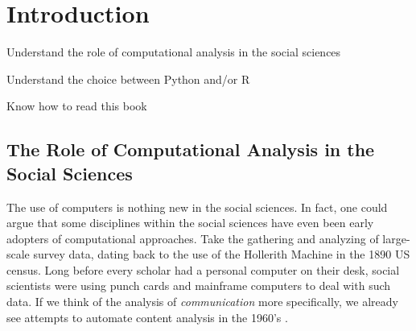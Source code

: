 \chapter{Introduction}
\label{chap:introduction}

\begin{abstract}{Abstract}
This chapter explains how the methods outlined in this book are
situated within the methodological and epistemological frameworks used
by social scientists. It argues why the use of Python and R is
fundamental for the computational analysis of communication. Finally,
it shows how this book can be used by students and scholars.
\end{abstract}


\begin{objectives}
\item Understand the role of computational analysis in the social sciences
\item Understand the choice between Python and/or R
\item Know how to read this book
\end{objectives}


%
\section{The Role of Computational Analysis in the Social Sciences}
\label{sec:ccs}

The use of computers is nothing new in the social sciences. In fact,
one could argue that some disciplines within the social sciences have
even been early adopters of computational approaches. Take the
gathering and analyzing of large-scale survey data, dating back to
the use of the Hollerith Machine in the 1890 US census. Long before
every scholar had a personal computer on their desk, social scientists
were using punch cards and mainframe computers to deal with such
data. If we think of the analysis of \emph{communication}
more specifically, we already see attempts to automate content analysis
 in the 1960's \citep[see, e.g.][]{Scharkow2017}.

